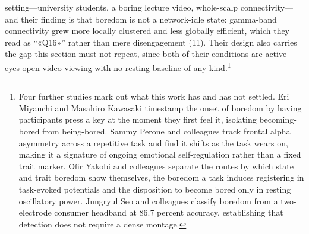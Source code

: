 setting---university students, a boring lecture video, whole-scalp connectivity---and their
finding is that boredom is not a network-idle state: gamma-band connectivity grew more locally
clustered and less globally efficient, which they read as ``«Q16»'' rather than mere
disengagement (11). Their design also carries the gap this section must not repeat, since both
of their conditions are active eyes-open video-viewing with no resting baseline of any
kind.\footnote{Four further studies mark out what this work has and has not settled. Eri
Miyauchi and Masahiro Kawasaki timestamp the onset of boredom by having participants press a
key at the moment they first feel it, isolating becoming-bored from being-bored. Sammy Perone
and colleagues track frontal alpha asymmetry across a repetitive task and find it shifts as
the task wears on, making it a signature of ongoing emotional self-regulation rather than a
fixed trait marker. Ofir Yakobi and colleagues separate the routes by which state and trait
boredom show themselves, the boredom a task induces registering in task-evoked potentials and
the disposition to become bored only in resting oscillatory power. Jungryul Seo and colleagues classify boredom from a
two-electrode consumer headband at 86.7 percent accuracy, establishing that detection does not
require a dense montage.}

